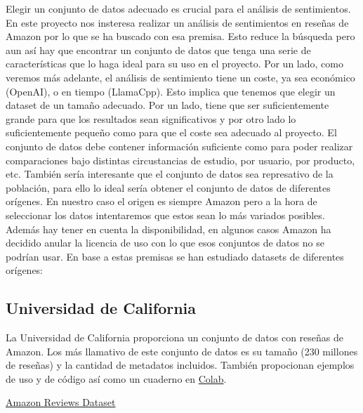 Elegir un conjunto de datos adecuado es crucial para el análisis de sentimientos.
En este proyecto nos insteresa realizar un análisis de sentimientos en reseñas de 
Amazon por lo que se ha buscado con esa premisa. Esto reduce la búsqueda pero aun así hay que encontrar 
un conjunto de datos que tenga una serie de características que lo haga ideal para su uso en el proyecto.
Por un lado, como veremos más adelante, el análisis de sentimiento tiene un coste, ya sea económico (OpenAI), o en tiempo (LlamaCpp).
Esto implica que tenemos que elegir un dataset de un tamaño adecuado.
Por un lado, tiene que ser suficientemente grande para que los resultados sean significativos y por otro lado lo suficientemente
 pequeño como para que el coste sea adecuado al proyecto.
El conjunto de datos debe contener información suficiente como para poder realizar comparaciones bajo distintas circustancias de estudio, por usuario, por producto, etc.
También sería interesante que el conjunto de datos sea represativo de la población, para ello lo ideal sería obtener el conjunto de datos de diferentes orígenes.
En nuestro caso el origen es siempre Amazon pero a la hora de seleccionar los datos intentaremos que estos sean lo más variados posibles.
Además hay tener en cuenta la disponibilidad, en algunos casos Amazon ha decidido anular la licencia de uso con lo que esos conjuntos de datos no se podrían usar.
En base a estas premisas se han estudiado datasets de diferentes orígenes:

\subsection{Universidad de California~\cite{jin018}}
La Universidad de California proporciona un conjunto de datos con reseñas de Amazon. Los más llamativo de este conjunto de datos es su tamaño (230 millones de reseñas) y la cantidad de metadatos incluidos.
También propocionan ejemplos de uso y de código así como un cuaderno en \href{https://colab.research.google.com/drive/1Zv6MARGQcrBbLHyjPVVMZVnRWsRnVMpV}{Colab}.
\par
\href{https://cseweb.ucsd.edu/~jmcauley/datasets/amazon_v2/}{Amazon Reviews Dataset}

